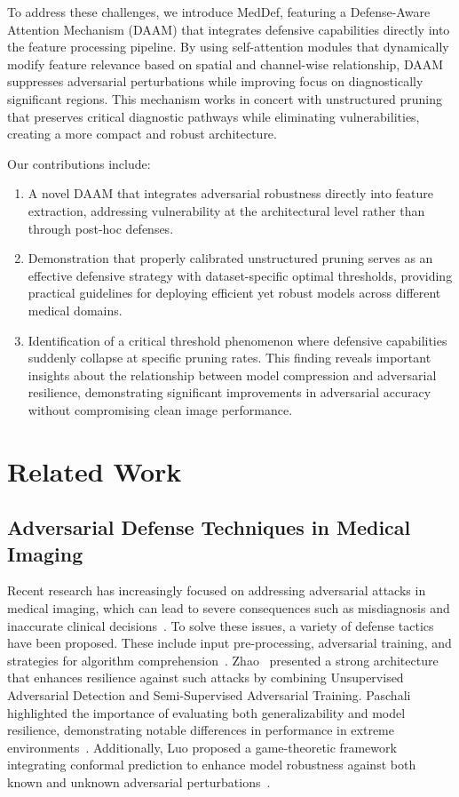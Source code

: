 \documentclass[preprint,12pt]{elsarticle}
\begin{document}
To address these challenges, we introduce MedDef, featuring a Defense-Aware Attention Mechanism (DAAM) that integrates defensive capabilities directly into the feature processing pipeline. By using self-attention modules that dynamically modify feature relevance based on spatial and channel-wise relationship, DAAM suppresses adversarial perturbations while improving focus on diagnostically significant regions. This mechanism works in concert with unstructured pruning that preserves critical diagnostic pathways while eliminating vulnerabilities, creating a more compact and robust architecture\cite{Liebenwein21}.

Our contributions include:
\begin{enumerate}
    \item A novel DAAM that integrates adversarial robustness directly into feature extraction, addressing vulnerability at the architectural level rather than through post-hoc defenses.
    
    \item Demonstration that properly calibrated unstructured pruning serves as an effective defensive strategy with dataset-specific optimal thresholds, providing practical guidelines for deploying efficient yet robust models across different medical domains.
    
    \item Identification of a critical threshold phenomenon where defensive capabilities suddenly collapse at specific pruning rates. This finding reveals important insights about the relationship between model compression and adversarial resilience, demonstrating significant improvements in adversarial accuracy without compromising clean image performance.
\end{enumerate}

\section{Related Work}
\label{sec:related_work}

\subsection{Adversarial Defense Techniques in Medical Imaging}
Recent research has increasingly focused on addressing adversarial attacks in medical imaging, which can lead to severe consequences such as misdiagnosis and inaccurate clinical decisions~\cite{Dhamija24}. To solve these issues, a variety of defense tactics have been proposed. These include input pre-processing, adversarial training, and strategies for algorithm comprehension~\cite{Pal24}. Zhao~\cite{Zhao22} presented a strong architecture that enhances resilience against such attacks by combining Unsupervised Adversarial Detection and Semi-Supervised Adversarial Training. Paschali highlighted the importance of evaluating both generalizability and model resilience, demonstrating notable differences in performance in extreme environments~\cite{Priya23}. Additionally, Luo proposed a game-theoretic framework integrating conformal prediction to enhance model robustness against both known and unknown adversarial perturbations~\cite{Luo24}.
\end{document}
